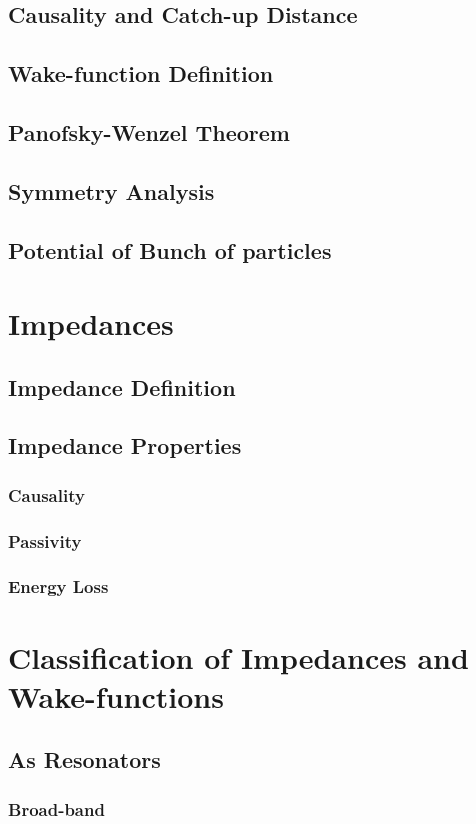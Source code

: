 \documentclass[
	12pt,				%
	openright,			%
	oneside,			%
	a4paper,		%
	chapter=TITLE,		%
	section=TITLE,		%
    brazil,				%
	english,			%
	sumario=tradicional,
	]{abntex2}
\begin{document}
    \subsection{Causality and Catch-up Distance}
    \subsection{Wake-function Definition}
    \subsection{Panofsky-Wenzel Theorem}
    \subsection{Symmetry Analysis}
    \subsection{Potential of Bunch of particles}
  \section{Impedances}
    \subsection{Impedance Definition}
    \subsection{Impedance Properties}
      \subsubsection{Causality}
      \subsubsection{Passivity}
      \subsubsection{Energy Loss}
  \section{Classification of Impedances and Wake-functions}
    \subsection{As Resonators}
      \subsubsection{Broad-band}
\end{document}
